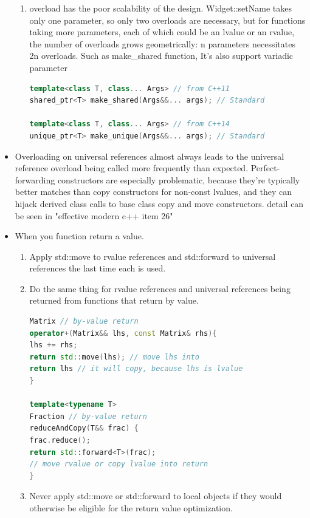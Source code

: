 \documentclass[a4paper,12pt,twoside]{book}
\begin{document}
\begin{itemize}
\begin{enumerate}
\item overload has the poor scalability of the design. Widget::setName takes only one parameter, so
only two overloads are necessary, but for functions taking more parameters, each of
which could be an lvalue or an rvalue, the number of overloads grows geometrically: n parameters necessitates 2n overloads. Such as make\_shared function, It's also support variadic parameter

\begin{lstlisting}[frame=single, language=c++]
template<class T, class... Args> // from C++11
shared_ptr<T> make_shared(Args&&... args); // Standard

template<class T, class... Args> // from C++14
unique_ptr<T> make_unique(Args&&... args); // Standard
\end{lstlisting}

\end{enumerate}


\item Overloading on universal references almost always leads to the universal reference
overload being called more frequently than expected. Perfect-forwarding constructors are especially problematic, because they're typically better matches than copy constructors for non-const lvalues, and
they can hijack derived class calls to base class copy and move constructors. detail can be seen in "effective modern c++ item 26"


\item When you function return a value.
\begin{enumerate}
\item Apply std::move to rvalue references and std::forward to universal references
the last time each is used.

\item Do the same thing for rvalue references and universal references being
returned from functions that return by value.
\begin{lstlisting}[frame=single, language=c++]
Matrix // by-value return
operator+(Matrix&& lhs, const Matrix& rhs){
lhs += rhs;
return std::move(lhs); // move lhs into
return lhs // it will copy, because lhs is lvalue
}

template<typename T>
Fraction // by-value return
reduceAndCopy(T&& frac) {
frac.reduce();
return std::forward<T>(frac);
// move rvalue or copy lvalue into return
}
\end{lstlisting}
\item Never apply std::move or std::forward to local objects if they would otherwise
be eligible for the return value optimization.
\end{enumerate}

\end{itemize}
\end{document}
